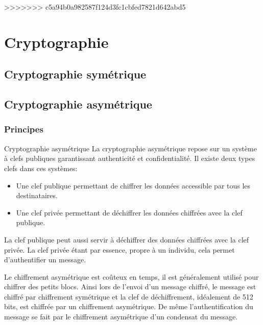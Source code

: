 \documentclass[twoside,a4paper,12pt,titlepage]{book}
\begin{document}
>>>>>>> c5a94b0a982587f124d3fc1cbfed7821d642abd5

\appendix
\chapter{Cryptographie}
\section{Cryptographie symétrique}
\section{Cryptographie asymétrique}
\subsection{Principes}
\begin{Define}{Cryptographie asymétrique}
La cryptographie asymétrique repose sur un système à clefs publiques garantissant authenticité et confidentialité. Il existe deux types clefs dans ces systèmes:\begin{itemize}
\item Une clef publique permettant de chiffrer les données accessible par tous les destinataires.
\item Une clef privée permettant de déchiffrer les données chiffrées avec la clef publique.
\end{itemize}
La clef publique peut aussi servir à déchiffrer des données chiffrées avec la clef privée. La clef privée étant par essence, propre à un individu, cela permet d'authentifier un message.
\end{Define}
\begin{Warning}
Le chiffrement asymétrique est coûteux en temps, il est généralement utilisé pour chiffrer des petits blocs. Ainsi lors de l'envoi d'un message chiffré, le message est chiffré par chiffrement symétrique et la clef de déchiffrement, idéalement de 512 bits, est chiffrée par un chiffrement asymétrique. De même l'authentification du message se fait par le chiffrement asymétrique d'un condensat du message.
\end{Warning}
\end{document}
